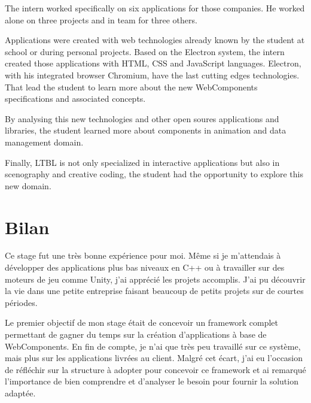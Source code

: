 \documentclass{article}
\begin{document}
    The intern worked specifically on six applications for those companies.
    He worked alone on three projects and in team for three others.

    Applications were created with web technologies already known by the student at school or during personal projects.
    Based on the Electron system, the intern created those applications with HTML, CSS and JavaScript languages.
    Electron, with his integrated browser Chromium, have the last cutting edges technologies.
    That lead the student to learn more about the new WebComponents specifications and associated concepts.

    By analysing this new technologies and other open soures applications and libraries, the student learned more about components in animation and data management domain.

    Finally, LTBL is not only specialized in interactive applications but also in scenography and creative coding,
    the student had the opportunity to explore this new domain.

    \clearpage

    

    

    

    

    

    

    

    \section{Bilan}

    Ce stage fut une très bonne expérience pour moi.
    Même si je m'attendais à développer des applications plus bas niveaux en C++ ou à travailler sur des moteurs de jeu comme Unity, j'ai apprécié les projets accomplis.
    J'ai pu découvrir la vie dans une petite entreprise faisant beaucoup de petits projets sur de courtes périodes.

    Le premier objectif de mon stage était de concevoir un framework complet permettant de gagner du temps sur la création d'applications à base de WebComponents.
    En fin de compte, je n'ai que très peu travaillé sur ce système, mais plus sur les applications livrées au client.
    Malgré cet écart, j'ai eu l'occasion de réfléchir sur la structure à adopter pour concevoir ce framework et ai remarqué l'importance de bien comprendre et d'analyser le besoin pour fournir la solution adaptée.
\end{document}
